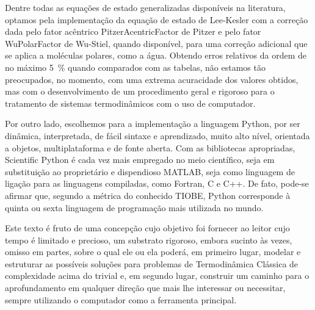     Dentre todas as equações de estado generalizadas disponíveis na literatura,
    optamos pela implementação da equação de estado de Lee-Kesler com a
    correção dada pelo fator acêntrico \gls{PitzerAcentricFactor} de Pitzer e
    pelo fator \gls{WuPolarFactor} de Wu-Stiel, quando disponível, para uma
    correção adicional que se aplica a moléculas polares, como a água. Obtendo
    erros relativos da ordem de no máximo \SI{5}{\percent} quando comparados
    com as tabelas, não estamos tão preocupados, no momento, com uma extrema
    acuracidade dos valores obtidos, mas com o desenvolvimento de um
    procedimento geral e rigoroso para o tratamento de sistemas termodinâmicos
    com o uso de computador.

    Por outro lado, escolhemos para a implementação a linguagem Python, por ser
    dinâmica, interpretada, de fácil sintaxe e aprendizado, muito alto nível,
    orientada a objetos, multiplataforma e de fonte aberta. Com as bibliotecas
    apropriadas, Scientific Python é cada vez mais empregado no meio
    científico, seja em substituição ao proprietário e dispendioso MATLAB, seja
    como linguagem de ligação para as linguagens compiladas, como Fortran, C e
    C++.  De fato, pode-se afirmar que, segundo a métrica do conhecido TIOBE,
    Python corresponde à quinta ou sexta linguagem de programação mais
    utilizada no mundo.

    Este texto é fruto de uma concepção cujo objetivo foi fornecer ao leitor
    cujo tempo é limitado e precioso, um substrato rigoroso, embora sucinto às
    vezes, omisso em partes, sobre o qual ele ou ela poderá, em primeiro lugar,
    modelar e estruturar as possíveis soluções para problemas de Termodinâmica
    Clássica de complexidade acima do trivial e, em segundo lugar, construir um
    caminho para o aprofundamento em qualquer direção que mais lhe interessar
    ou necessitar, sempre utilizando o computador como a ferramenta principal.

